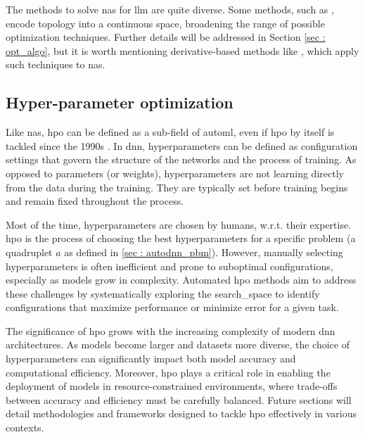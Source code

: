 The methods to solve \acrshort{nas} for \acrshort{llm} are quite diverse. Some methods, such as \cite{XX}, encode topology into a continuous space, broadening the range of possible optimization techniques. Further details will be addressed in Section \ref{sec : opt_algo}, but it is worth mentioning derivative-based methods like \cite{liu_darts_2019}, which apply such techniques to \acrshort{nas}.

\subsection{Hyper-parameter optimization}

Like \acrshort{nas}, \acrshort{hpo} can be defined as a sub-field of \acrshort{automl}, even if \acrshort{hpo} by itself is tackled since the 1990s \cite{hutter2019automated}. In \acrfull{dnn}, \glspl{hyperparameter} can be defined as configuration settings that govern the structure of the networks and the process of training. As opposed to parameters (or weights), \glspl{hyperparameter} are not learning directly from the data during the training. They are typically set before training begins and remain fixed throughout the process.

Most of the time, \glspl{hyperparameter} are chosen by humans, w.r.t. their expertise. \acrshort{hpo} is the process of choosing the best \glspl{hyperparameter} for a specific problem (a quadruplet $a$ as defined in \ref{sec : autodnn_pbm}). However, manually selecting \glspl{hyperparameter} is often inefficient and prone to suboptimal configurations, especially as models grow in complexity. Automated \acrshort{hpo} methods aim to address these challenges by systematically exploring the \gls{search_space} to identify configurations that maximize performance or minimize error for a given task.

The significance of \acrshort{hpo} grows with the increasing complexity of modern \acrshort{dnn} architectures. As models become larger and datasets more diverse, the choice of \glspl{hyperparameter} can significantly impact both model accuracy and computational efficiency. Moreover, \acrshort{hpo} plays a critical role in enabling the deployment of models in resource-constrained environments, where trade-offs between accuracy and efficiency must be carefully balanced. Future sections will detail methodologies and frameworks designed to tackle \acrshort{hpo} effectively in various contexts.



